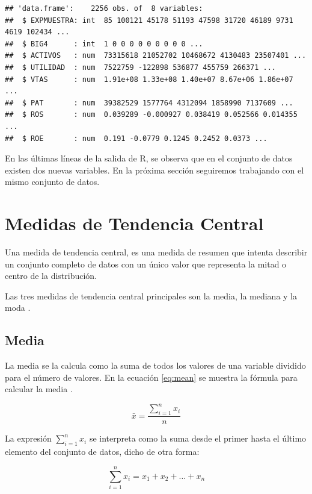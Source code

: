 \documentclass[
]{krantz}
\begin{document}
\begin{verbatim}
## 'data.frame':    2256 obs. of  8 variables:
##  $ EXPMUESTRA: int  85 100121 45178 51193 47598 31720 46189 9731 4619 102434 ...
##  $ BIG4      : int  1 0 0 0 0 0 0 0 0 0 ...
##  $ ACTIVOS   : num  73315618 21052702 10468672 4130483 23507401 ...
##  $ UTILIDAD  : num  7522759 -122898 536877 455759 266371 ...
##  $ VTAS      : num  1.91e+08 1.33e+08 1.40e+07 8.67e+06 1.86e+07 ...
##  $ PAT       : num  39382529 1577764 4312094 1858990 7137609 ...
##  $ ROS       : num  0.039289 -0.000927 0.038419 0.052566 0.014355 ...
##  $ ROE       : num  0.191 -0.0779 0.1245 0.2452 0.0373 ...
\end{verbatim}

En las últimas líneas de la salida de R, se observa que en el conjunto de datos existen dos nuevas variables. En la próxima sección seguiremos trabajando con el mismo conjunto de datos.

\hypertarget{tendcentr}{%
\section{Medidas de Tendencia Central}\label{tendcentr}}

Una medida de tendencia central, es una medida de resumen que intenta describir un conjunto completo de datos con un único valor que representa la mitad o centro de la distribución.

Las tres medidas de tendencia central principales son la media, la mediana y la moda \citep{devore2012_2}.

\hypertarget{media}{%
\subsection{Media}\label{media}}

La media se la calcula como la suma de todos los valores de una variable dividido para el número de valores. En la ecuación \eqref{eq:mean} se muestra la fórmula para calcular la media \citep{macfarland2014}.

\begin{equation} 
  \bar{x} = \dfrac{\sum_{i=1}^{n}x_i}{n}
  \label{eq:mean}
\end{equation}

La expresión \(\sum_{i=1}^{n} x_i\) se interpreta como la suma desde el primer hasta el último elemento del conjunto de datos, dicho de otra forma:

\begin{equation} 
  \sum_{i=1}^{n} x_i = x_1 + x_2 + \ldots + x_n 
  \label{eq:sum}
\end{equation}
\end{document}
